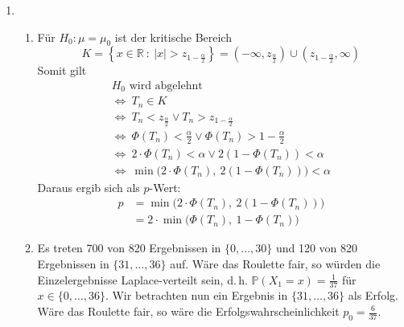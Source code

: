 \documentclass[a4paper]{scrartcl}
\newcommand{\gdw}{\Leftrightarrow}
\newcommand{\prob}{\mathbb{P}}
\def \blattnr {9}
\begin{document}
\begin{enumerate}[label=\bfseries \blattnr.\arabic*]
    \item 
        \begin{enumerate}
            \item
                Für $H_0\colon \mu = \mu_0$ ist der kritische Bereich
                \begin{equation*}
                    K = \left\{
                            x \in \mathbb{R}\ :\ 
                            |x| > z_{1-\frac{\alpha}{2}}
                    \right\}
                    = \left( -\infty, z_{\frac{\alpha}{2}} \right) \cup
                    \left( z_{1-\frac{\alpha}{2}}, \infty \right)
                \end{equation*}
                Somit gilt
                \begin{gather*}
                    H_0 \text{ wird abgelehnt} \\
                    \gdw\ T_n \in K \\
                    \gdw\ T_n < z_{\frac{\alpha}{2}} \lor T_n > z_{1-\frac{\alpha}{2}} \\
                    \gdw\ \Phi(T_n) < \frac{\alpha}{2} \lor \Phi(T_n) > 1-\frac{\alpha}{2} \\
                    \gdw\ 2 \cdot \Phi(T_n) < \alpha \lor 2(1-\Phi(T_n)) < \alpha \\
                    \gdw\ \min \Big(2 \cdot \Phi(T_n),\ 2(1-\Phi(T_n)) \Big) < \alpha
                \end{gather*}
                Daraus ergib sich als $p$-Wert:
                \begin{equation*}
	                \begin{split}
	                    p 
                        &= \min \Big(2 \cdot \Phi(T_n),\ 2(1-\Phi(T_n)) \Big) \\
                        &= 2 \cdot \min \Big(\Phi(T_n),\ 1-\Phi(T_n) \Big)
	                \end{split}
	            \end{equation*}
       
            \item 
                Es treten 700 von 820 Ergebnissen in $\{0, \dotsc, 30\}$ und
                120 von 820 Ergebnissen in $\{31, \dotsc, 36\}$ auf.  Wäre das
                Roulette fair, so würden die Einzelergebnisse Laplace-verteilt
                sein, d.\,h. $\prob(X_1 = x) = \frac{1}{37}$ für $x \in \{0,
                \dotsc, 36\}$.
                Wir betrachten nun ein Ergebnis in $\{31, \dotsc, 36\}$ als
                Erfolg. Wäre das Roulette fair, so wäre die
                Erfolgswahrscheinlichkeit $p_0 = \frac{6}{37}$.


\end{enumerate}
\end{enumerate}
\end{document}
